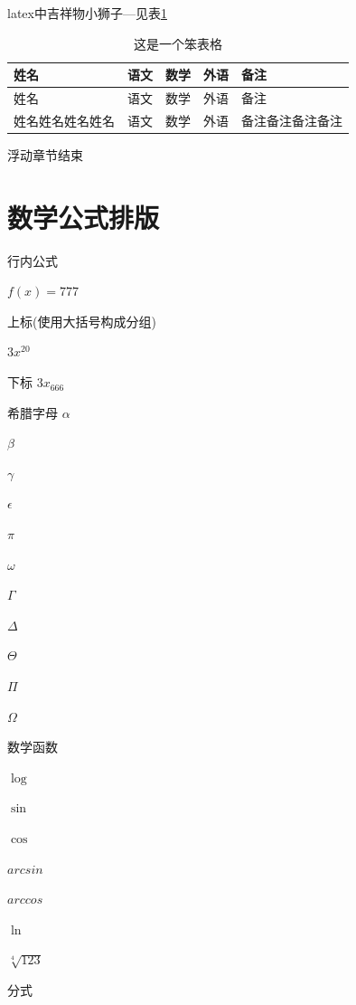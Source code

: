 \documentclass[8pt]{article}
\begin{document}
	
	latex中吉祥物小狮子---见表\ref{table-test}
	
	\begin{table}[htbp]
	
		\centering
		\caption{这是一个笨表格}\label{table-test}
		\begin{tabular}{| l || c | c | c |p{1.5cm}|}
			\hline
			姓名 & 语文 & 数学 & 外语 & 备注 \\
			\hline
			姓名 & 语文 & 数学 & 外语 & 备注 \\
			\hline
			姓名姓名姓名姓名 & 语文 & 数学 & 外语 & 备注备注备注备注 \\
			\hline
		\end{tabular}
		
	\end{table}
	
	
	浮动章节结束
	
	\section{数学公式排版}
	
	行内公式
	
	$f(x) = 777$
	
	上标(使用大括号构成分组)
	
	$3x^{20}$
	
	下标
	$3x_{666}$
	
	希腊字母
	$\alpha$
	
	$\beta$
	
	$\gamma$
	
	$\epsilon$
	
	$\pi$
	
	$\omega$
	
	$\Gamma$
	
	$\Delta$
	
	$\Theta$
	
	$\Pi$
	
	$\Omega$
	
	
	数学函数
	
	$\log$
	
	$\sin$
	
	$\cos$
	
	$arcsin$
	
	$arccos$
	
	$\ln$
	
	$\sqrt[4]{123}$
	
	分式
	
\end{document}
